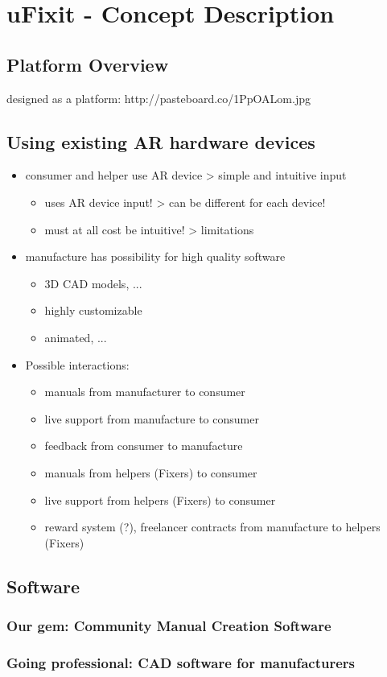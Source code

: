 
\chapter{uFixit - Concept Description}

	\section{Platform Overview}
	
		designed as a platform: http://pasteboard.co/1PpOALom.jpg
	
	\section{Using existing AR hardware devices}
	
		\begin{itemize}
			\itemsep0em
			\item consumer and helper use AR device > simple and intuitive input \begin{itemize}
				\itemsep0em
				\item uses AR device input! > can be different for each device!
				\item must at all cost be intuitive! > limitations
			\end{itemize}
			\item manufacture has possibility for high quality software \begin{itemize}
				\itemsep0em
				\item 3D CAD models, ...
				\item highly customizable
				\item animated, ...
			\end{itemize}
			\item Possible interactions: \begin{itemize}
				\itemsep0em
				\item manuals from manufacturer to consumer
				\item live support from manufacture to consumer
				\item feedback from consumer to manufacture
				\item manuals from helpers (Fixers) to consumer
				\item live support from helpers (Fixers) to consumer
				\item reward system (?), freelancer contracts from manufacture to helpers (Fixers)
			\end{itemize}
		\end{itemize}
		
	\section{Software}
		
		\subsection{Our gem: Community Manual Creation Software}
	
		\subsection{Going professional: CAD software for manufacturers}
